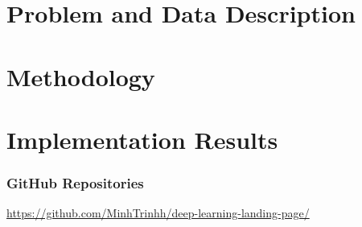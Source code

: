 \documentclass[a4paper]{article}
\begin{document}

\vspace{1em}

\clearpage

\label{tocpage}
\tableofcontents
\listoffigures
\listoftables

\newpage

\clearpage

\part{Problem and Data Description}






\clearpage
\part{Methodology}





\clearpage
\part{Implementation Results}








\clearpage



\section*{GitHub Repositories}
\href{https://github.com/MinhTrinhh/deep-learning-landing-page/}{https://github.com/MinhTrinhh/deep-learning-landing-page/}
\end{document}
